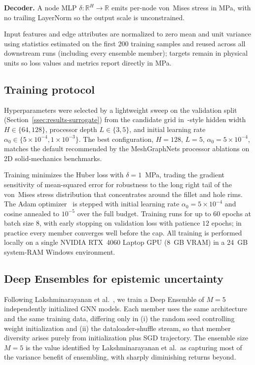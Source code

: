 \documentclass[11pt]{article}
\begin{document}
\textbf{Decoder.} A node MLP $\delta : \mathbb{R}^H \to \mathbb{R}$ emits
per-node von~Mises stress in MPa, with no trailing LayerNorm so the output
scale is unconstrained.

Input features and edge attributes are normalized to zero mean and unit
variance using statistics estimated on the first $200$ training samples
and reused across all downstream runs (including every ensemble member);
targets remain in physical units so loss values and metrics report
directly in MPa.

\subsection{Training protocol}
\label{ssec:training}

Hyperparameters were selected by a lightweight sweep on the validation
split (Section~\ref{ssec:results-surrogate}) from the candidate grid
in~\cite{pfaff2021meshgraphnets}-style hidden width $H \in \{64, 128\}$,
processor depth $L \in \{3, 5\}$, and initial learning rate
$\alpha_0 \in \{5 \times 10^{-4}, 1 \times 10^{-3}\}$. The best
configuration, $H = 128$, $L = 5$, $\alpha_0 = 5 \times 10^{-4}$, matches
the default recommended by the MeshGraphNets processor ablations on
2D solid-mechanics benchmarks.

Training minimizes the Huber loss with $\delta = 1$~MPa, trading the
gradient sensitivity of mean-squared error for robustness to the long
right tail of the von~Mises stress distribution that concentrates around
the fillet and hole rims. The Adam optimizer~\cite{pfaff2021meshgraphnets}
is stepped with initial learning rate $\alpha_0 = 5 \times 10^{-4}$ and
cosine annealed to $10^{-5}$ over the full budget. Training runs for up
to $60$ epochs at batch size $8$, with early stopping on validation loss
with patience $12$ epochs; in practice every member converges well before
the cap. All training is performed locally on a single NVIDIA RTX~4060
Laptop GPU (8~GB VRAM) in a 24~GB system-RAM Windows environment.

\subsection{Deep Ensembles for epistemic uncertainty}
\label{ssec:ensembles}

Following Lakshminarayanan et al.~\cite{lakshminarayanan2017ensembles}, we
train a Deep Ensemble of $M = 5$ independently initialized GNN models. Each
member uses the same architecture and the same training data, differing
only in (i) the random seed controlling weight initialization and (ii) the
dataloader-shuffle stream, so that member diversity arises purely from
initialization plus SGD trajectory. The ensemble size $M = 5$ is the
value identified by Lakshminarayanan et al.\ as capturing most of the
variance benefit of ensembling, with sharply diminishing returns beyond.
\end{document}

